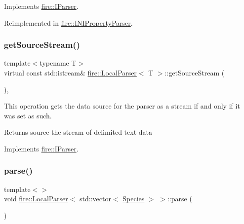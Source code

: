 Implements \hyperlink{a00808_ab55d2644dfa6d950d1f874e1e02df095}{fire\+::\+I\+Parser}.



Reimplemented in \hyperlink{a00804_ad02c9a530f20a706d7bb2554813e8d3a}{fire\+::\+I\+N\+I\+Property\+Parser}.

\mbox{\label{a00816_a9bf19a3cc9ae8ac0e6e7a0e7f6212cdc}} 
\subsubsection{\texorpdfstring{get\+Source\+Stream()}{getSourceStream()}}
{\footnotesize\ttfamily template$<$typename T$>$ \\
virtual const std\+::istream\& \hyperlink{a00816}{fire\+::\+Local\+Parser}$<$ T $>$\+::get\+Source\+Stream (\begin{DoxyParamCaption}{ }\end{DoxyParamCaption})\hspace{0.3cm}{\ttfamily [inline]}, {\ttfamily [virtual]}}

This operation gets the data source for the parser as a stream if and only if it was set as such. \begin{DoxyReturn}{Returns}
source the stream of delimited text data 
\end{DoxyReturn}


Implements \hyperlink{a00808_ac94c7a288bf669322b93ba171c43f90e}{fire\+::\+I\+Parser}.

\mbox{\label{a00816_ae904e264fe16708b3e434adea59e1b88}} 
\subsubsection{\texorpdfstring{parse()}{parse()}\hspace{0.1cm}{\footnotesize\ttfamily [1/3]}}
{\footnotesize\ttfamily template$<$$>$ \\
void \hyperlink{a00816}{fire\+::\+Local\+Parser}$<$ std\+::vector$<$ \hyperlink{a00760}{Species} $>$ $>$\+::parse (\begin{DoxyParamCaption}{ }\end{DoxyParamCaption})\hspace{0.3cm}{\ttfamily [virtual]}}

